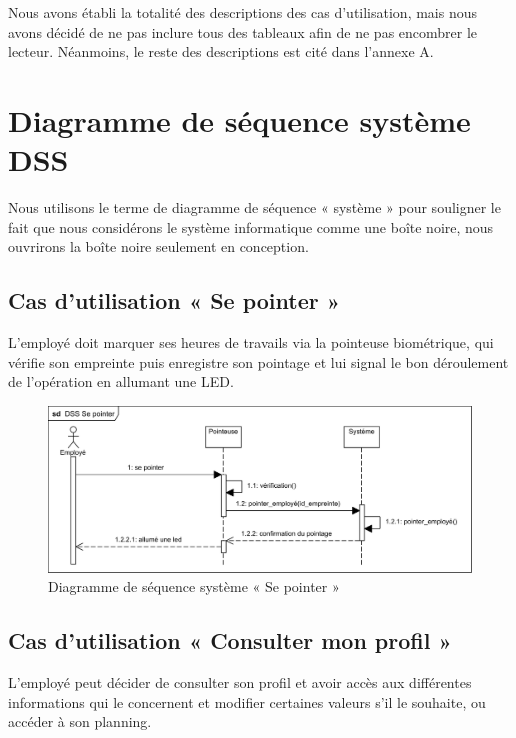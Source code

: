             
Nous avons établi la totalité des descriptions des cas d’utilisation, mais nous
avons décidé de ne pas inclure tous des tableaux afin de ne pas encombrer le
lecteur. Néanmoins, le reste des descriptions est cité dans l’annexe A.  
    
                
\section{Diagramme de séquence système DSS}
Nous utilisons le terme de diagramme de séquence « système » pour souligner le
fait que nous considérons le système informatique comme une boîte noire, nous
ouvrirons la boîte noire seulement en conception.\cite{5}
    
\subsection{Cas d'utilisation « Se pointer »}
L’employé doit marquer ses heures de travails via la pointeuse biométrique, qui
vérifie son empreinte puis enregistre son pointage et lui signal le bon
déroulement de l’opération en allumant une LED.

    \begin{figure}[h!]
         \centering
        \includegraphics[scale=0.9]{images/DSS/DSS Se pointer.png}
         \caption{Diagramme de séquence système « Se pointer »}
         \label{fig4}
    \end{figure}
\vspace{-30pt}
\clearpage
\subsection{Cas d'utilisation « Consulter mon profil »}
L’employé peut décider de consulter son profil et avoir accès aux différentes
informations qui le concernent et modifier certaines valeurs s’il le souhaite, 
ou accéder à son planning. 
 
